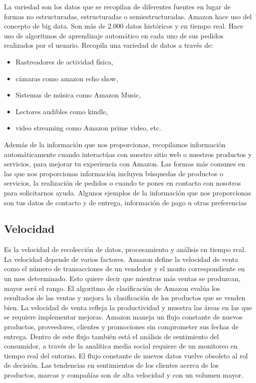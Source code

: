 La variedad son los datos que se recopilan de diferentes fuentes en lugar de formas no estructuradas, estructuradas o semiestructuradas. Amazon hace uso del concepto de big data. Son más de 2.000 datos históricos y en tiempo real. Hace uso de algoritmos de aprendizaje automático en cada uno de sus pedidos realizados por el usuario. Recopila una variedad de datos a través de:

\begin{itemize}
	\item Rastreadores de actividad física,
	\item cámaras como amazon echo show,
	\item Sistemas de música como Amazon Music,
	\item Lectores audibles como kindle,
	\item video streaming como Amazon prime video, etc.
\end{itemize}

Además de la información que nos proporcionas, recopilamos información automáticamente cuando interactúas con nuestro sitio web o nuestros productos y servicios, para mejorar tu experiencia con Amazon.
Las formas más comunes en las que nos proporcionas información incluyen búsquedas de productos o servicios, la realización de pedidos o cuando te pones en contacto con nosotros para solicitarnos ayuda. Algunos ejemplos de la información que nos proporcionas son tus datos de contacto y de entrega, información de pago u otras preferencias 


\clearpage
\subsection{Velocidad}

Es la velocidad de recolección de datos, procesamiento y análisis en tiempo real. La velocidad depende de varios factores. Amazon define la velocidad de venta como el número de transacciones de un vendedor y el monto correspondiente en un mes determinado. Esto quiere decir que mientras más ventas se produzcan, mayor será el rango. El algoritmo de clasificación de Amazon evalúa los resultados de las ventas y mejora la clasificación de los productos que se venden bien. La velocidad de venta refleja la productividad y muestra las áreas en las que se requiere implementar mejoras.
Amazon maneja un flujo constante de nuevos productos, proveedores, clientes y promociones sin comprometer sus fechas de entrega.
Dentro de este flujo también está el análisis de sentimiento del consumidor, a través de la analítica media social requiere de un monitoreo en tiempo real del entorno. El flujo constante de nuevos datos vuelve obsoleto al rol de decisión. Las tendencias en sentimientos de los clientes acerca de los productos, marcas y compañías son de alta velocidad y con un volumen mayor.



